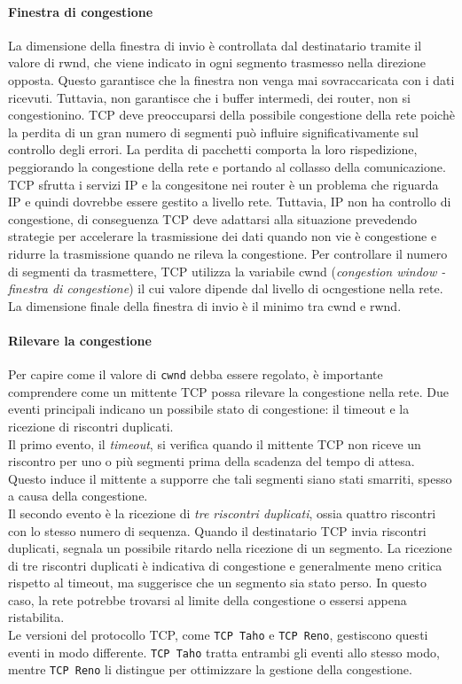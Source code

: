 \documentclass[12pt]{report}
\begin{document}
	\paragraph{Finestra di congestione}
	La dimensione della finestra di invio è controllata dal destinatario tramite il valore di rwnd, che viene indicato in ogni segmento trasmesso nella direzione opposta. Questo garantisce che la finestra non venga mai sovraccaricata con i dati ricevuti. Tuttavia, non garantisce che i buffer intermedi, dei router, non si congestionino. TCP deve preoccuparsi della possibile congestione della rete poichè la perdita di un gran numero di segmenti può influire significativamente sul controllo degli errori. La perdita di pacchetti comporta la loro rispedizione, peggiorando la congestione della rete e portando al collasso della comunicazione.
	\vspace{\baselineskip}\\
	TCP sfrutta i servizi IP e la congesitone nei router è un problema che riguarda IP e quindi dovrebbe essere gestito a livello rete. Tuttavia, IP non ha controllo di congestione, di conseguenza TCP deve adattarsi alla situazione prevedendo strategie per accelerare la trasmissione dei dati quando non vie è congestione e ridurre la trasmissione quando ne rileva la congestione. Per controllare il numero di segmenti da trasmettere, TCP utilizza la variabile cwnd (\textit{congestion window - finestra di congestione}) il cui valore dipende dal livello di ocngestione nella rete. La dimensione finale della finestra di invio è il minimo tra cwnd e rwnd.

	\paragraph{Rilevare la congestione}
	Per capire come il valore di \texttt{cwnd} debba essere regolato, è importante comprendere come un mittente TCP possa rilevare la congestione nella rete. Due eventi principali indicano un possibile stato di congestione: il timeout e la ricezione di riscontri duplicati.\\
	Il primo evento, il \textit{timeout}, si verifica quando il mittente TCP non riceve un riscontro per uno o più segmenti prima della scadenza del tempo di attesa. Questo induce il mittente a supporre che tali segmenti siano stati smarriti, spesso a causa della congestione.\\
	Il secondo evento è la ricezione di \textit{tre riscontri duplicati}, ossia quattro riscontri con lo stesso numero di sequenza. Quando il destinatario TCP invia riscontri duplicati, segnala un possibile ritardo nella ricezione di un segmento. La ricezione di tre riscontri duplicati è indicativa di congestione e generalmente meno critica rispetto al timeout, ma suggerisce che un segmento sia stato perso. In questo caso, la rete potrebbe trovarsi al limite della congestione o essersi appena ristabilita.\\
	Le versioni del protocollo TCP, come \texttt{TCP Taho} e \texttt{TCP Reno}, gestiscono questi eventi in modo differente. \texttt{TCP Taho} tratta entrambi gli eventi allo stesso modo, mentre \texttt{TCP Reno} li distingue per ottimizzare la gestione della congestione.
\end{document}
